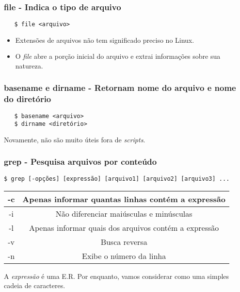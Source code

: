 \documentclass{beamer}
\begin{document}
\begin{frame}[fragile]
   \frametitle{file - Indica o tipo de arquivo}
   \begin{verbatim}
   $ file <arquivo>
   \end{verbatim}
   \begin{itemize}
      \item Extensões de arquivos não tem significado preciso no Linux.
      \item O \textit{file} abre a porção inicial do arquivo e extrai informações sobre sua natureza.
   \end{itemize}
\end{frame}

\begin{frame}[fragile]
   \frametitle{basename e dirname - Retornam nome do arquivo e nome do diretório}
   \begin{verbatim}
   $ basename <arquivo> 
   $ dirname <diretório>
   \end{verbatim}
   Novamente, não são muito úteis fora de \textit{scripts}.
\end{frame}

\begin{frame}[fragile]
   \frametitle{grep - Pesquisa arquivos por conteúdo}
   \scriptsize
   \begin{verbatim}
$ grep [-opções] [expressão] [arquivo1] [arquivo2] [arquivo3] ...
   \end{verbatim}
   \normalsize
   \begin{table}
      \begin{tabular}{ c | c }
         \hline
         -c & Apenas informar quantas linhas contém a expressão \\
         \hline 
         -i & Não diferenciar maiúsculas e minúsculas \\
         \hline
         -l & Apenas informar quais dos arquivos contém a expressão \\
         \hline
         -v & Busca reversa \\
         \hline
         -n & Exibe o número da linha \\
         \hline
      \end{tabular}
   \end{table}
   A \textit{expressão} é uma E.R. Por enquanto, vamos considerar como uma simples cadeia de caracteres.
\end{frame}
\end{document}
